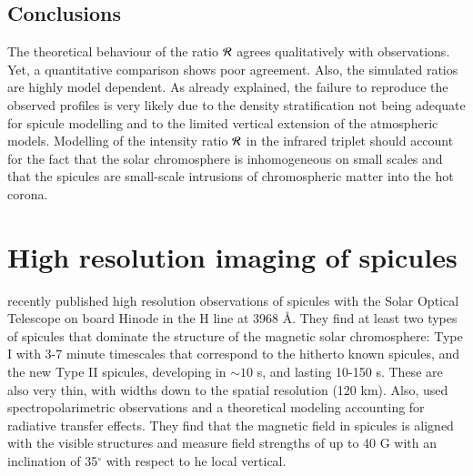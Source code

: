 \subsection{Conclusions\label{conclusion}}
The theoretical behaviour of the ratio $\cal R$ agrees
qualitatively with observations. Yet, a quantitative comparison shows poor
agreement. Also, the simulated ratios are highly model dependent. 
As already explained, {  the failure to reproduce the observed profiles is very likely due to the density stratification not being adequate for spicule modelling and to the limited vertical extension of the atmospheric models.}
Modelling of the intensity ratio $\cal R$ in the
 infrared triplet should account for the fact that the solar
chromosphere is inhomogeneous on small scales and that the spicules are
small-scale intrusions of chromospheric matter into the hot corona.
\begin{comment}
New data of spicule regions near the poles and the equator, below coronal 
holes or coronal active regions should help us to understand the detailed 
behaviour of the \ion{He}{i} 10830~\AA\ lines.
In further work, we will extend this study to the full Stokes vector, in order to see  
the variation of the linear polarization - or even the variation of the Hanle effect - with height. {  It would also be interesting to use the most recent models of active region fibrils and spicules \citep[e.g.,][]{hegg07} in order to see whether or not they agree with our observations.} Future models of the solar chromosphere should be constrained by the observational evidences presented here.
\end{comment}


\section{High resolution imaging of spicules\label{sec:limb:ha}}

\cite{2007arXiv0710.2934D} recently published high resolution observations of spicules with the Solar Optical Telescope on board Hinode  \citep{2007SoPh..243....3K} in the  H line at 3968 \AA. They find at least two types of spicules that dominate the structure of the magnetic solar chromosphere: Type I with 3-7 minute timescales that correspond to the hitherto known spicules, and the new Type II spicules, developing in  $\sim10$ s, and lasting 10-150 s. These are also very thin, with widths down to the spatial resolution (120 km).  Also, \cite{truj05} used spectropolarimetric observations and a theoretical modeling accounting for radiative transfer effects. They find that the magnetic field in spicules is aligned with the visible structures and measure field strengths of up to 40 G with an inclination of 35$^{\circ}$ with respect to he local vertical. 


